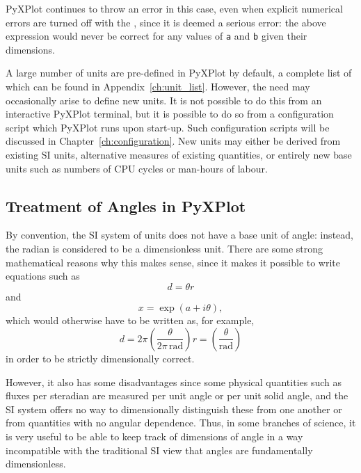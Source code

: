\noindent PyXPlot continues to throw an error in this case, even when explicit
numerical errors are turned off with the ,
since it is deemed a serious error: the above expression would never be correct
for any values of {\tt a} and {\tt b} given their dimensions.

A large number of units are pre-defined in PyXPlot by default, a complete list
of which can be found in Appendix~\ref{ch:unit_list}.  However, the need may
occasionally arise to define new units. It is not possible to do this from an
interactive PyXPlot terminal, but it is possible to do so from a configuration
script which PyXPlot runs upon start-up. Such configuration scripts will be
discussed in Chapter~\ref{ch:configuration}. New units may either be derived
from existing SI units, alternative measures of existing quantities, or
entirely new base units such as numbers of CPU cycles or man-hours of labour.

\subsection{Treatment of Angles in PyXPlot}
\label{sec:angles}

By convention, the SI system of units does not have a base unit of angle:
instead, the radian is considered to be a dimensionless unit.  There are some
strong mathematical reasons why this makes sense, since it makes it possible to
write equations such as
\begin{displaymath}
d=\theta r
\end{displaymath}
and
\begin{displaymath}
x = \exp(a+i\theta),
\end{displaymath}
which would otherwise have to be written as, for example,
\begin{displaymath}
d=2\pi\left(\frac{\theta}{2\pi\,\mathrm{rad}}\right) r=\left(\frac{\theta}{\mathrm{rad}}\right)
\end{displaymath}
in order to be strictly dimensionally correct.

However, it also has some disadvantages since some physical quantities such as
fluxes per steradian are measured per unit angle or per unit solid angle, and
the SI system offers no way to dimensionally distinguish these from one another
or from quantities with no angular dependence. Thus, in some branches of
science, it is very useful to be able to keep track of dimensions of angle in a
way incompatible with the traditional SI view that angles are fundamentally
dimensionless.

